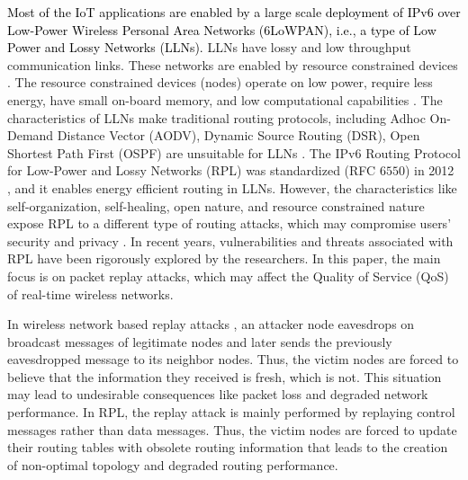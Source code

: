 \documentclass[]{svjour3}                     %
\begin{document}
\textcolor{black}{Most of the IoT applications are enabled by a large scale deployment of IPv6 over Low-Power Wireless Personal Area Networks (6LoWPAN), i.e., a type of Low Power and Lossy Networks (LLNs).} LLNs have lossy and low throughput communication links. These networks are enabled by resource constrained devices \cite{COLAKOVIC2018, winter2012rpl}. The resource constrained devices (nodes) operate on low power, require less energy, have small on-board memory, and low computational capabilities \cite{Musaddiq}. The characteristics of LLNs make traditional routing protocols, including Adhoc On-Demand Distance Vector (AODV), Dynamic Source Routing (DSR), Open Shortest Path First (OSPF) are unsuitable for LLNs \cite{tripathi2014design}. The IPv6 Routing Protocol for Low-Power and Lossy Networks (RPL) was standardized (RFC $ 6550 $) in 2012 \cite{winter2012rpl}, and it enables energy efficient routing in LLNs. However, the characteristics like self-organization, self-healing, open nature, and resource constrained nature expose RPL to a different type of routing attacks, which may compromise users' security and privacy \cite{RIAHISFAR2018118, Verma2019, shafique2018detection,sahay2020novel}. In recent years, vulnerabilities and threats associated with RPL have been rigorously explored by the researchers. In this paper, the main focus is on packet replay attacks, which may affect the Quality of Service (QoS) of real-time wireless networks. 


In wireless network based replay attacks \cite{kannhavong2007survey,4599222}, an attacker node eavesdrops on broadcast messages of legitimate nodes and later sends the previously eavesdropped message to its neighbor nodes. Thus, the victim nodes are forced to believe that the information they received is fresh, which is not. This situation may lead to undesirable consequences like packet loss and degraded network performance. In RPL, the replay attack is mainly performed by replaying control messages rather than data messages. Thus, the victim nodes are forced to update their routing tables with obsolete routing information that leads to the creation of non-optimal topology and degraded routing performance.
\end{document}
